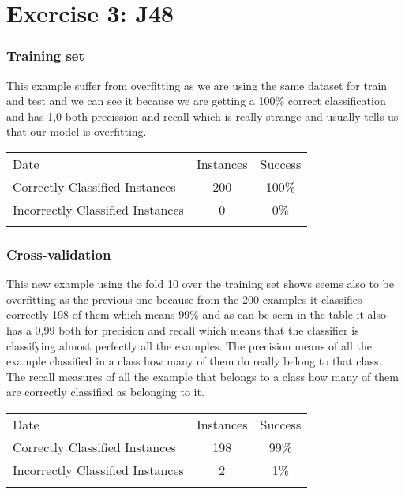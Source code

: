 \documentclass[]{article}
\begin{document}
\section{Exercise 3: J48}\label{exercise-3-j48}

\subsubsection{Training set}\label{training-set-3}

This example suffer from overfitting as we are using the same dataset
for train and test and we can see it because we are getting a 100\%
correct classification and has 1,0 both precission and recall which is
really strange and usually tells us that our model is overfitting.

\begin{longtable}[c]{@{}lcc@{}}
\toprule\addlinespace
Date & Instances & Success
\\\addlinespace
\midrule\endhead
Correctly Classified Instances & 200 & 100\%
\\\addlinespace
Incorrectly Classified Instances & 0 & 0\%
\\\addlinespace
\bottomrule
\end{longtable}

\subsubsection{Cross-validation}\label{cross-validation-2}

This new example using the fold 10 over the training set shows seems
also to be overfitting as the previous one because from the 200 examples
it classifies correctly 198 of them which means 99\% and as can be seen
in the table it also has a 0,99 both for precision and recall which
means that the classifier is classifying almost perfectly all the
examples. The precision means of all the example classified in a class
how many of them do really belong to that class. The recall measures of
all the example that belongs to a class how many of them are correctly
classified as belonging to it.

\begin{longtable}[c]{@{}lcc@{}}
\toprule\addlinespace
Date & Instances & Success
\\\addlinespace
\midrule\endhead
Correctly Classified Instances & 198 & 99\%
\\\addlinespace
Incorrectly Classified Instances & 2 & 1\%
\\\addlinespace
\bottomrule
\end{longtable}
\end{document}
